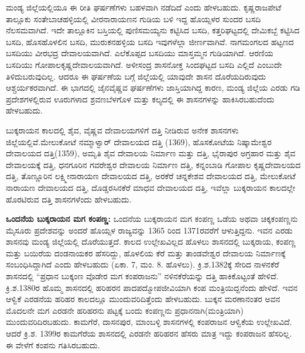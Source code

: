ಮಂಡ್ಯ ಜಿಲ್ಲೆಯಲ್ಲಿಯೂ ಈ ರೀತಿ ಘರ್ಷಣೆಗಳು ಬಹಳವಾಗಿ ನಡೆದಿದೆ ಎಂದು ಹೇಳಬಹುದು. ಕೃಷ್ಣರಾಜಪೇಟೆ ತಾಲ್ಲೂಕು ಸಂತೇಬಾಚಹಳ್ಳಿಯಲ್ಲಿ ವೀರನಾರಾಯಣನ ಗುಡಿಯ ಬಳಿ ಇದ್ದ ಹೊಯ್ಸಳರ ಸುಂದರ ಬಸದಿ ನೆಲಸಮವಾಗಿದೆ. ಇದೇ ತಾಲ್ಲೂಕಿನ ಬಸ್ತಿಯಲ್ಲಿ ಪುಣಿಸಮಯ್ಯನು ಕಟ್ಟಿಸಿದ ಬಸದಿ, ಕತ್ತರಿಘಟ್ಟದಲ್ಲಿ ದೇಮಿಕಬ್ಬೆ ಕಟ್ಟಿಸಿದ ಬಸದಿ, ಹೊಸಹೊಳಲಿನ ಬಸದಿ, ಮುರುಕನಹಳ್ಳಿಯ ಬಸದಿ ಇವುಗಳೆಲ್ಲಾ ಜೀರ್ಣವಾಗಿವೆ. ನಾಗಮಂಗಲದ ಹಟ್ಟಣದ ಬಸದಿಯು ವೀರಭದ್ರ ದೇವಾಲಯವಾಗಿದೆ. ಎಲೆಕೊಪ್ಪದ ಬಸದಿಯು ಮಾಸ್ತಮ್ಮನ ಗುಡಿಯಾಗಿದೆ. ಆರಣಿಯ ಬಸದಿಯು ಗೋಪಾಲಕೃಷ್ಣ\-ದೇವಾಲಯವಾಗಿದೆ. ಅಳೀಸಂದ್ರ ಶಾಸನೋಕ್ತ ಸಿಂದಘಟ್ಟದ ಬಸದಿ ಎಲ್ಲಿದೆ ಎಂಬುದೇ ತಿಳಿದುಬರುವುದಿಲ್ಲ. ಆದರೂ ಈ ಘರ್ಷಣೆಯ ಬಗ್ಗೆ ಜಿಲ್ಲೆಯಲ್ಲಿ ಯಾವುದೇ ಶಾಸನ ದೊರೆಯದಿರುವುದು ಆಶ್ಚರ್ಯಕರವಾಗಿದೆ. ಈ ಭಾಗದಲ್ಲಿ ಜೈನ\enginline{-}ವೈಷ್ಣವ ಘರ್ಷಣೆಗಳು ಜಾಸ್ತಿಯಾಗಿದ್ದ ಕಾರಣ, ಮಂಡ್ಯ ಜಿಲ್ಲೆಯ ಎರಡು ಗಡಿ ಪ್ರದೇಶಗಳಲ್ಲಿರುವ ಊರುಗಳಾದ ಶ್ರವಣಬೆಳಗೊಳ ಮತ್ತು ಕಲ್ಯದಲ್ಲಿ ಈ ಶಾಸನಗಳನ್ನು ಹಾಕಿಸಿರಬಹುದೆಂದು ಹೇಳಬಹುದು.

ಬುಕ್ಕರಾಯನ ಕಾಲದಲ್ಲಿ ಶೈವ, ವೈಷ್ಣವ ದೇವಾಲಯಗಳಿಗೆ ದತ್ತಿ ನೀಡಿರುವ ಅನೇಕ ಶಾಸನಗಳು ಜಿಲ್ಲೆಯಲ್ಲಿವೆ.\break ಮೇಲುಕೋಟೆ ನಮ್ಮಾಳ್ವಾರ್​ ದೇವಾಲಯದ ದತ್ತಿ (1369), ಹೊಸಕೋಟೆಯ ನಿಷ್ಕಾಮೇಶ್ವರ ದೇವಾಲಯದ ದತ್ತಿ(1359), ಅಮೃತಿ ಶೈವ ದೇವಾಲಯ ನಿರ್ಮಾಣ ಮತ್ತು ದತ್ತಿ, ಭೈರಾಪುರ ಅಗ್ರಹಾರ ಮತ್ತು ಶೈವ ದೇವಾಲಯಕ್ಕೆ ದತ್ತಿ, ಧನಗೂರಿನ ಗವರೇಶ್ವರ ದೇವಾಲಯ ನಿರ್ಮಾಣ ದತ್ತಿ, ಕನ್ನಂಬಾಡಿ ಗೋಪಾಲ ಕೃಷ್ಣದೇವಾಲಯದ ದತ್ತಿ, ತೊಣ್ಣೂರಿನ ಲಕ್ಷ್ಮೀನಾರಾಯಣ ದೇವಾಲಯದ ದತ್ತಿ, ಅರಕೆರೆ ಚನ್ನಕೇಶವ ದೇವಾಲಯದ ದತ್ತಿ, ಮೇಲುಕೋಟೆ ನಾರಾಯಣ ದೇವಾಲಯದ ದತ್ತಿ, ದೊಡ್ಡರಸಿನಕೆರೆ ಮಾಧವ ದೇವಾಲಯದ ದತ್ತಿ, ಇವೆಲ್ಲಾ ಬುಕ್ಕರಾಯನ ಕಾಲದಲ್ಲೇ ಹೊರಟಿರುವ ದತ್ತಿ ಶಾಸನಗಳೆಂದು ಹೇಳಬಹುದು.

\textbf{ ಒಂದನೆಯ ಬುಕ್ಕರಾಯನ ಮಗ ಕಂಪಣ್ಣ:} ಒಂದನೆಯ ಬುಕ್ಕರಾಯನ ಮಗ ಕಂಪಣ್ಣ ಒಡೆಯ ಅಥವಾ ಚಿಕ್ಕಕಂಪಣ್ಣನು ಮೈಸೂರು ಪ್ರದೇಶವನ್ನು ಅಂದರೆ ಹೊಯ್ಸಳ ರಾಜ್ಯವನ್ನು 1365 ರಿಂದ 1371ರವರೆಗೆ ಆಳುತ್ತಿದ್ದನು. ಇವನ ಎರಡು ಶಾಸನವು ಮಂಡ್ಯ ಜಿಲ್ಲೆಯಲ್ಲಿ ದೊರೆಯುತ್ತದೆ. ಕಾಲದ ಉಲ್ಲೇಖವಿಲ್ಲದ ಹೊಳಲು ಶಾಸನದಲ್ಲಿ ಬುಕ್ಕರಾಯ, ಕಂಪಣ್ಣ ಮತ್ತು ಬಯಿರೆಯ ದಂಡನಾಯಕರ ಹೆಸರಿದ್ದು, ಹೊಳಲಿಯ ಕೆರೆ ಮತ್ತು ತಾಂಡವೇಶ್ವರ ದೇವಾಲಯ ನಿರ್ಮಾಣಕ್ಕೆ ಸಂಬಂಧಿಸಿದ್ದಾಗಿದೆ ಎಂದು ಹೇಳಬಹುದು (ಏಕಾ. 7, ಮಂ. 8. ಹೊಳಲು). ಕ್ರಿ.ಶ.1382ಕ್ಕೆ ಸೇರಿದ ನಾಳನಕೆರೆ ಶಾಸನದಲ್ಲಿ “ಪ್ರಧಾನ ಬುಕ್ಕಂಣ ವೊಡೇರ ಮಗ ಕಂಪರಾಜನು” ನಳಿನಕೆರೆಯನ್ನು ದತ್ತಿ ಹಾಕಿಕೊಟ್ಟಂತೆ ಹೇಳಿದೆ. ಕ್ರಿ.ಶ.1380ರ ಹೊಮ್ಮ ಶಾಸನದಲ್ಲಿ ಹರಿಹರನ ಪಾದಪದ್ಮೋಪಜೀವಿಯಾಗಿ ಕಂಪ ಮಂತ್ರಿಯಿದ್ದನೆಂದು ಹೇಳಿದೆ. ಇವನ ಆಳ್ವಿಕೆ ಎರಡನೆಯ ಹರಿಹರ ಕಾಲದಲ್ಲೂ ಮುಂದುವರಿದಿತ್ತೆಂದು ಹೇಳಬಹುದು. ಬುಕ್ಕನ ಮರಣಾನಂತರ ಅವನ ಮೊದಲನೇ ಮಗ ಎರಡನೇ ಹರಿಹರನು ಪಟ್ಟಕ್ಕೆ ಬಂದು ಕಂಪಣ್ಣನು ಪ್ರಧಾನನಾಗಿ(ಮಂತ್ರಿಯಾಗಿ) ಮುಂದುವರಿದಿರಬಹುದು. ಕಾಮಗೆರೆ, ದಾಸನಪುರ, ಮಾಂಬಳ್ಳಿ ಶಾಸನಗಳಲ್ಲಿ ಕಂಪರಾಜನ ಆಳ್ವಿಕೆಯ ಉಲ್ಲೇಖವಿದೆ. ಆದರೆ ಕ್ರಿ.ಶ. 1399ರ ಕಾಮಗೆರೆಯ ಶಾಸನದಲ್ಲಿ ಎರಡನೇ ಹರಿಹರನ ಹೆಸರು ಮಾತ್ರ ಇದ್ದು ಕಂಪರಾಜನ ಹೆಸರಿಲ್ಲ. ಈ ವೇಳೆಗೆ ಕಂಪನು ಗತಿಸಿರಬಹುದು.

